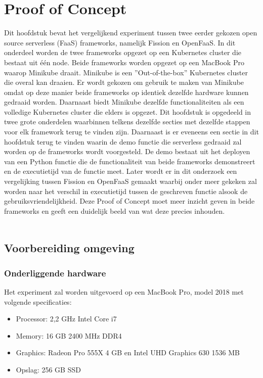 \chapter{Proof of Concept}
\label{ch:proof-of-concept}
Dit hoofdstuk bevat het vergelijkend experiment tussen twee eerder gekozen open source serverless (FaaS) frameworks, namelijk Fission en OpenFaaS. In dit onderdeel worden de twee frameworks opgezet op een Kubernetes cluster die bestaat uit één node. Beide frameworks worden opgezet op een MacBook Pro waarop Minikube draait. Minikube is een ''Out-of-the-box'' Kubernetes cluster die overal kan draaien. Er wordt gekozen om gebruik te maken van Minikube omdat op deze manier beide frameworks op identiek dezelfde hardware kunnen gedraaid worden. Daarnaast biedt Minikube dezelfde functionaliteiten als een volledige Kubernetes cluster die elders is opgezet. Dit hoofdstuk is opgedeeld in twee grote onderdelen waarbinnen telkens dezelfde secties met dezelfde stappen voor elk framework terug te vinden zijn. Daarnaast is er eveneens een sectie in dit hoofdstuk terug te vinden waarin de demo functie die serverless gedraaid zal worden op de frameworks wordt voorgesteld. De demo bestaat uit het deployen van een Python functie die de functionaliteit van beide frameworks demonstreert en de executietijd van de functie meet. Later wordt er in dit onderzoek een vergelijking tussen Fission en OpenFaaS gemaakt waarbij onder meer gekeken zal worden naar het verschil in executietijd tussen de geschreven functie alsook de gebruiksvriendelijkheid. Deze Proof of Concept moet meer inzicht geven in beide frameworks en geeft een duidelijk beeld van wat deze precies inhouden.
\\\\
\section{Voorbereiding omgeving}
\label{sec:voorbereiding-omgeving}
\subsection{Onderliggende hardware}
Het experiment zal worden uitgevoerd op een MacBook Pro, model 2018 met volgende specificaties:
\begin{itemize}
    \item Processor: 2,2 GHz Intel Core i7
    \item Memory: 16 GB 2400 MHz DDR4
    \item Graphics: Radeon Pro 555X 4 GB en Intel UHD Graphics 630 1536 MB
    \item Opslag: 256 GB SSD
\end{itemize}

